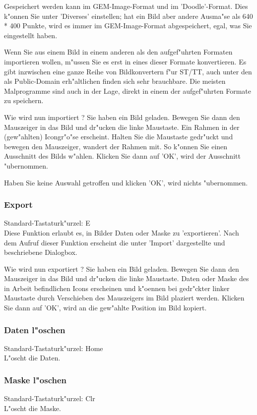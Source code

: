 Gespeichert werden kann im GEM-Image-Format und im 
'Doodle'-Format. Dies k"onnen Sie unter 'Diverses' einstellen;
hat ein Bild aber andere Ausma"se als 640 * 400 Punkte, wird
es immer im GEM-Image-Format abgespeichert, egal, was Sie
eingestellt haben.

Wenn Sie aus einem Bild in einem anderen als den
aufgef"uhrten Formaten importieren wollen, m"ussen Sie
es erst in eines dieser Formate konvertieren. Es gibt
inzwischen eine ganze Reihe von Bildkonvertern f"ur ST/TT,
auch unter den als Public-Domain erh"altlichen finden sich
sehr brauchbare. Die meisten Malprogramme sind auch in der 
Lage, direkt in einem der aufgef"uhrten Formate zu speichern.

Wie wird nun importiert ? Sie haben ein Bild geladen. Bewegen
Sie dann den Mauszeiger in das Bild und dr"ucken die
linke Maustaste. Ein Rahmen in der (gew"ahlten) Icongr"o"se 
erscheint. Halten Sie die Maustaste gedr"uckt und bewegen den
Mauszeiger, wandert der Rahmen mit. So k"onnen Sie einen 
Ausschnitt des Bilds w"ahlen. Klicken Sie dann auf 'OK', wird
der Ausschnitt "ubernommen.

Haben Sie keine Auswahl getroffen und klicken 'OK', wird nichts
"ubernommen.  

\subsubsection{Export}
Standard-Tastaturk"urzel: {\control}E \\
 
Diese Funktion erlaubt es, in Bilder Daten oder Maske
zu 'exportieren'. Nach dem Aufruf dieser Funktion erscheint 
die unter 'Import' dargestellte und beschriebene Dialogbox.

Wie wird nun exportiert ? Sie haben ein Bild geladen. Bewegen
Sie dann den Mauszeiger in das Bild und dr"ucken die
linke Maustaste. Daten oder Maske des in Arbeit befindlichen
Icons erscheinen und k"oennen bei gedr"ckter linker Maustaste
durch Verschieben des Mauszeigers im Bild plaziert werden.
Klicken Sie dann auf 'OK', wird an die gew"ahlte Position
im Bild kopiert.
 
\subsubsection{Daten l"oschen}
Standard-Tastaturk"urzel: Home \\
 
L"oscht die Daten.

\subsubsection{Maske l"oschen}
Standard-Tastaturk"urzel: Clr \\
 
L"oscht die Maske.

